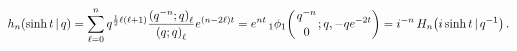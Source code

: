 \[\mathop{h_{n}\/}\nolimits\!\left(\mathop{\sinh\/}\nolimits t\,|\,q\right)=\sum%
_{\ell=0}^{n}q^{\frac{1}{2}\ell(\ell+1)}\frac{\left(q^{-n};q\right)_{\ell}}{%
\left(q;q\right)_{\ell}}e^{(n-2\ell)t}=e^{nt}\mathop{{{}_{1}\phi_{1}}\/}%
\nolimits\!\left({q^{-n}\atop 0};q,-qe^{-2t}\right)=i^{-n}\mathop{H_{n}\/}%
\nolimits\!\left(i\mathop{\sinh\/}\nolimits t\,|\,q^{-1}\right).\]